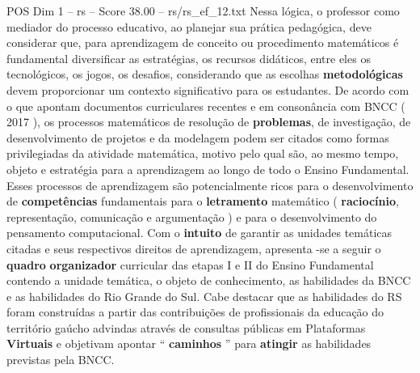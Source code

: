 \begin{textsample}{POS Dim 1 – rs – Score 38.00 – rs/rs\_ef\_12.txt}
Nessa lógica, o professor como mediador do processo educativo, ao planejar sua prática pedagógica, deve considerar que, para aprendizagem de conceito ou procedimento matemáticos é fundamental diversificar as estratégias, os recursos didáticos, entre eles os tecnológicos, os jogos, os desafios, considerando que as escolhas \textbf{metodológicas} devem proporcionar um contexto significativo para os estudantes.
De acordo com o que apontam documentos curriculares recentes e em consonância com BNCC ( 2017 ), os processos matemáticos de resolução de \textbf{problemas}, de investigação, de desenvolvimento de projetos e da modelagem podem ser citados como formas privilegiadas da atividade matemática, motivo pelo qual são, ao mesmo tempo, objeto e estratégia para a aprendizagem ao longo de todo o Ensino Fundamental.
Esses processos de aprendizagem são potencialmente ricos para o desenvolvimento de \textbf{competências} fundamentais para o \textbf{letramento} matemático ( \textbf{raciocínio}, representação, comunicação e argumentação ) e para o desenvolvimento do pensamento computacional.
Com o \textbf{intuito} de garantir as unidades temáticas citadas e seus respectivos direitos de aprendizagem, apresenta -se a seguir o \textbf{quadro} \textbf{organizador} curricular das etapas I e II do Ensino Fundamental contendo a unidade temática, o objeto de conhecimento, as habilidades da BNCC e as habilidades do Rio Grande do Sul.
Cabe destacar que as habilidades do RS foram construídas a partir das contribuições de profissionais da educação do território gaúcho advindas através de consultas públicas em Plataformas \textbf{Virtuais} e objetivam apontar “ \textbf{caminhos} ” para \textbf{atingir} as habilidades previstas pela BNCC.

\end{textsample}
